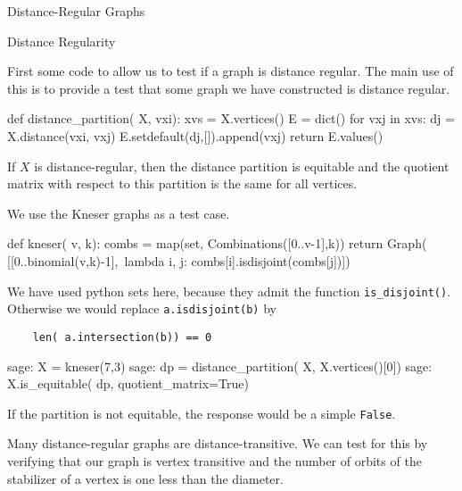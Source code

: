 \begin{chap}{Distance-Regular Graphs}
%
\begin{sect}{Distance Regularity}
%
\begin{para}
First some code to allow us to test if a graph is distance regular.
The main use of this is to provide a test that some graph we have constructed is
distance regular.
\end{para}
%
\begin{sageblock}
def distance_partition( X, vxi):
    xvs = X.vertices()
    E = dict()
    for vxj in xvs:
        dj = X.distance(vxi, vxj)
        E.setdefault(dj,[]).append(vxj)
    return E.values()    
\end{sageblock}
%    
\begin{para}
If $X$ is distance-regular, then the distance partition is equitable
and the quotient matrix with respect to this partition is the same for all
vertices. 
\end{para}
%
\begin{para}
We use the Kneser graphs as a test case.
\end{para}
%
\begin{sageblock}
def kneser( v, k):
    combs = map(set, Combinations([0..v-1],k))
    return Graph( [[0..binomial(v,k)-1],\
     lambda i, j: combs[i].isdisjoint(combs[j])])
\end{sageblock}
%
\begin{para}
We have used python sets here, because they admit the function \verb|is_disjoint()|.
Otherwise we would replace \verb|a.isdisjoint(b)| by
\end{para}
%
\begin{verbatim}
    len( a.intersection(b)) == 0
\end{verbatim}
%
\begin{sageexample}
sage: X = kneser(7,3)
sage: dp = distance_partition( X, X.vertices()[0])
sage: X.is_equitable( dp, quotient_matrix=True) 
\end{sageexample}
%
\begin{para}
If the partition is not equitable, the response would be a simple
\verb|False|.
\end{para}
%
\begin{para}
Many distance-regular graphs are distance-transitive. We can test for this
by verifying that our graph is vertex transitive and the number of
orbits of the stabilizer of a vertex is one less than the diameter.
\end{para}
%
\begin{sageexample}

\end{sageexample}
\end{sect}
\end{chap}
